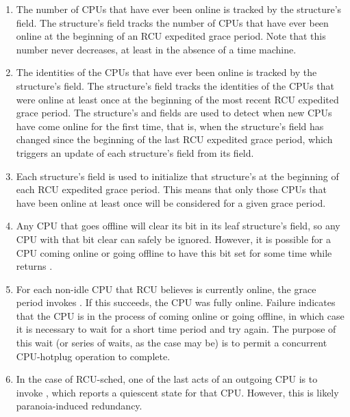 \begin{enumerate}
\item The number of CPUs that have ever been online is tracked by the
    structure's  field.
   The 
   structure's  field tracks the number of CPUs that
   have ever been online at the beginning of an RCU expedited grace
   period.
   Note that this number never decreases, at least in the
   absence of a time machine.

\item The identities of the CPUs that have ever been online is tracked by
   the  structure's  field.
   The
    structure's  field tracks the
   identities of the CPUs that were online at least once at the
   beginning of the most recent RCU expedited grace period.
   The
    structure's  and  fields are
   used to detect when new CPUs have come online for the first time,
   that is, when the  structure's 
   field has changed since the beginning of the last RCU expedited grace
   period, which triggers an update of each  structure's
    field from its  field.

\item Each  structure's  field is used to
   initialize that structure's  at the beginning of each
   RCU expedited grace period.
   This means that only those CPUs that have
   been online at least once will be considered for a given grace
   period.

\item Any CPU that goes offline will clear its bit in its leaf 
   structure's  field, so any CPU with that bit
   clear can safely be ignored.
   However, it is possible for a CPU coming
   online or going offline to have this bit set for some time while
    returns .

\item For each non-idle CPU that RCU believes is currently online, the
   grace period invokes .
   If this
   succeeds, the CPU was fully online.
   Failure indicates that the CPU is
   in the process of coming online or going offline, in which case it is
   necessary to wait for a short time period and try again.
   The purpose
   of this wait (or series of waits, as the case may be) is to permit a
   concurrent CPU-hotplug operation to complete.

\item In the case of RCU-sched, one of the last acts of an outgoing CPU is
   to invoke , which reports a quiescent state for
   that CPU\@.
   However, this is likely paranoia-induced redundancy.
\end{enumerate}

